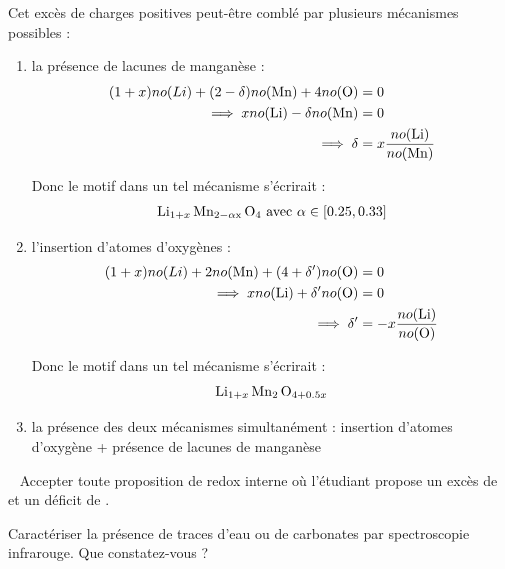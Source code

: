 \documentclass[twoside,a4paper,11pt,addpoints,answers]{exam}%
\begin{document}
\begin{questions}
\begin{mybox}
\begin{solution}[10cm]
Cet excès de charges positives peut-être comblé par plusieurs mécanismes possibles : 
\begin{enumerate}
\item la présence de lacunes de manganèse : 
\begin{align*}
(1+x) no (Li) +  (2-\delta) no ( \ce{Mn} ) + 4 no ( \ce{O} ) &= 0 \\
\implies x no ( \ce{Li} ) - \delta no ( \ce{Mn} ) &= 0 \\
\implies \delta &= x \frac{no ( \ce{Li} )}{no ( \ce{Mn} )}
\end{align*}

Donc le motif dans un tel mécanisme s'écrirait :
\begin{align*}
 \ce{Li_{1+x} Mn_{2 - \alpha x} O4} \text{ avec } \alpha \in [0.25, 0.33]
\end{align*}

\item l'insertion d'atomes d'oxygènes :
\begin{align*}
(1+x) no (Li) +  2 no ( \ce{Mn} ) + (4+\delta') no ( \ce{O} ) &= 0 \\
\implies x no ( \ce{Li} ) + \delta'  no ( \ce{O} ) &= 0 \\
\implies \delta' &= - x \frac{no ( \ce{Li} )}{no ( \ce{O} )}
\end{align*}

Donc le motif dans un tel mécanisme s'écrirait :
\begin{align*}
 \ce{Li_{1+x} Mn_{2} O_{4+0.5x}}
\end{align*}

\item la présence des deux mécanismes simultanément : insertion d'atomes d'oxygène + présence de lacunes de manganèse

\end{enumerate}

\faWarning ~ Accepter toute proposition de redox interne où l'étudiant propose un excès de  et un déficit de .

\end{solution}\end{mybox}


\question[1\half] \label{Q:2-04} Caractériser la présence de traces d'eau ou de carbonates par spectroscopie infrarouge. Que constatez-vous ?


\end{questions}
\end{document}
